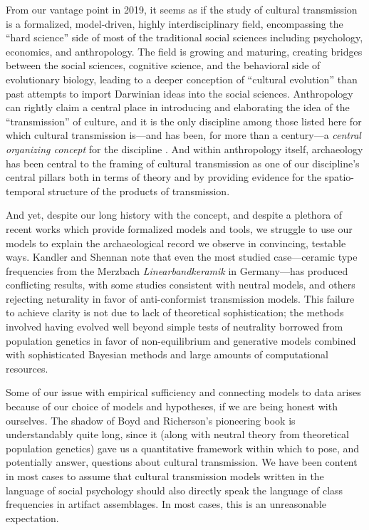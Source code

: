 
From our vantage point in 2019, it seems as if the study of cultural transmission is a formalized, model-driven, highly interdisciplinary field, encompassing the ``hard science'' side of most of the traditional social sciences including psychology, economics, and anthropology.  The field is growing and maturing, creating bridges between the social sciences, cognitive science, and the behavioral side of evolutionary biology, leading to a deeper conception of ``cultural evolution'' than past attempts to import Darwinian ideas into the social sciences.  Anthropology can rightly claim a central place in introducing and elaborating the idea of the ``transmission'' of culture, and it is the only discipline among those listed here for which cultural transmission is---and has been, for more than a century---a \emph{central organizing concept} for the discipline \citep{lyman2008cultural}.  And within anthropology itself, archaeology has been central to the framing of cultural transmission as one of our discipline's central pillars both in terms of theory and by providing evidence for the spatio-temporal structure of the products of transmission.

And yet, despite our long history with the concept, and despite a plethora of recent works which provide formalized models and tools, we struggle to use our models to explain the archaeological record we observe in convincing, testable ways.  Kandler and Shennan \citeyearpar{Kandler20150905} note that even the most studied case---ceramic type frequencies from the Merzbach \emph{Linearbandkeramik} in Germany---has produced conflicting results, with some studies consistent with neutral models, and others rejecting neturality in favor of anti-conformist transmission models.  This failure to achieve clarity is not due to lack of theoretical sophistication; the methods involved having evolved well beyond simple tests of neutrality borrowed from population genetics in favor of non-equilibrium and generative models combined with sophisticated Bayesian methods and large amounts of computational resources.  

Some of our issue with empirical sufficiency and connecting models to data arises because of our choice of models and hypotheses, if we are being honest with ourselves.  The shadow of Boyd and Richerson's \citeyearpar{BR1985} pioneering book is understandably quite long, since it (along with neutral theory from theoretical population genetics) gave us a quantitative framework within which to pose, and potentially answer, questions about cultural transmission.  We have been content in most cases to assume that cultural transmission models written in the language of social psychology should also directly speak the language of class frequencies in artifact assemblages.  In most cases, this is an unreasonable expectation. 

